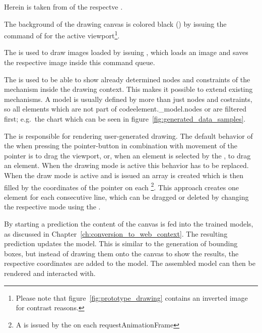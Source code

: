 Herein  is taken from  of the respectve  .

The background of the drawing canvas is colored black () by issuing the  command of  for the active viewport\footnote{Please note that figure~\ref{fig:prototype_drawing} contains an inverted image for contrast reasons.}.

The  is used to draw images loaded by issuing , which loads an image and saves the respective image inside this command queue.

The  is used to be able to show already determined nodes and constraints of the mechanism inside the drawing context.
This makes it possible to extend existing mechanisms.
A  model is usually defined by more than just nodes and costraints, so all elements which are not part of code{element.\_model.nodes} or  are filtered first; e.g.\ the chart which can be seen in figure~\ref{fig:generated_data_samples}.

The  is responsible for rendering user-generated drawing.
The default behavior of the  when pressing the pointer-button in combination with movement of the pointer is to drag the viewport, or, when an element is selected by the , to drag an element.
When the drawing mode is active this behavior has to be replaced.
When the draw mode is active and  is issued an array is created which is then filled by the coordinates of the pointer on each \footnote{A  is issued by the  on each requestAnimationFrame}.
This approach creates one  element for each consecutive line, which can be dragged or deleted by changing the respective mode using the  .

By starting a prediction the content of the canvas is fed into the trained models, as discussed in Chapter~\ref{ch:conversion_to_web_context}.
The resulting prediction updates the  model.
This is similar to the generation of bounding boxes, but instead of drawing them onto the canvas to show the results, the respective coordinates are added to the  model.
The assembled  model can then be rendered and interacted with.

